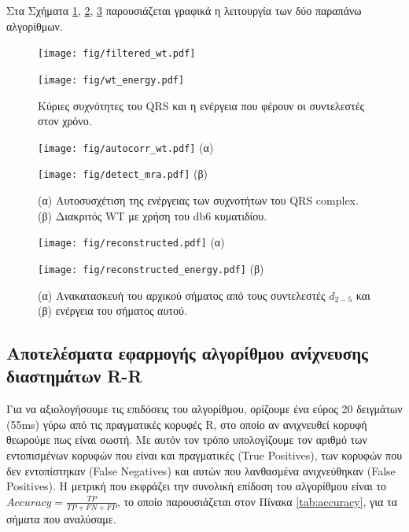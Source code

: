 \documentclass[11pt,a4paper]{article}
\renewcommand{\figurename}{Σχήμα}
\begin{document}
Στα \figurename{τα \ref{fig:algorithm1}, \ref{fig:algorithm2}, \ref{fig:algorithm3}} παρουσιάζεται γραφικά η λειτουργία των δύο παραπάνω αλγορίθμων.

\begin{figure}[H]
\centering
\begin{minipage}{0.48\textwidth}
	\centering
	\texttt{[image: fig/filtered\_wt.pdf]}
\end{minipage}
\begin{minipage}{0.48\textwidth}
	\centering
	\texttt{[image: fig/wt\_energy.pdf]}
\end{minipage}
\vfill
\caption{Κύριες συχνότητες του QRS και η ενέργεια που φέρουν οι συντελεστές στον χρόνο.}
\label{fig:algorithm1}
\end{figure}
\begin{figure}[H]
\centering
\begin{minipage}{0.48\textwidth}
	\centering
	\texttt{[image: fig/autocorr\_wt.pdf]}
	(α)
\end{minipage}
\begin{minipage}{0.48\textwidth}
	\centering
	\texttt{[image: fig/detect\_mra.pdf]}
	(β)
\end{minipage}
\vfill
\caption{(α) Αυτοσυσχέτιση της ενέργειας των συχνοτήτων του QRS complex. (β) Διακριτός WT με χρήση του db6 κυματιδίου.}
\label{fig:algorithm2}
\end{figure}
\begin{figure}[H]
\centering
\begin{minipage}{0.48\textwidth}
	\centering
	\texttt{[image: fig/reconstructed.pdf]}
	(α)
\end{minipage}
\begin{minipage}{0.48\textwidth}
	\centering
	\texttt{[image: fig/reconstructed\_energy.pdf]}
	(β)
\end{minipage}
\vfill
\caption{(α) Ανακατασκευή του αρχικού σήματος από τους συντελεστές $d_{2-5}$ και (β) ενέργεια του σήματος αυτού.}
\label{fig:algorithm3}
\end{figure}

\subsection*{Αποτελέσματα εφαρμογής αλγορίθμου ανίχνευσης διαστημάτων R-R}

Για να αξιολογήσουμε τις επιδόσεις του αλγορίθμου, ορίζουμε ένα εύρος 20 δειγμάτων (55ms) γύρω από τις πραγματικές κορυφές R, στο οποίο αν ανιχνευθεί κορυφή θεωρούμε πως είναι σωστή. Με αυτόν τον τρόπο υπολογίζουμε τον αριθμό των εντοπισμένων κορυφών που είναι και πραγματικές (True Positives), των κορυφών που δεν εντοπίστηκαν (False Negatives) και αυτών που λανθασμένα ανιχνεύθηκαν (False Positives). Η μετρική που εκφράζει την συνολική επίδοση του αλγορίθμου είναι το $Accuracy = \frac{TP}{TP+FN+FP}$, το οποίο παρουσιάζεται στον Πίνακα \ref{tab:accuracy}, για τα σήματα που αναλύσαμε.
\end{document}

